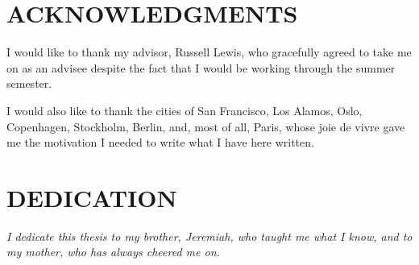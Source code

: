 \documentclass[12pt]{report} %
\renewcommand{\listtablename}{LIST OF TABLES}
\begin{document}
\chapter*{ACKNOWLEDGMENTS}
\thispagestyle{fancy} %

I would like to thank my advisor, Russell Lewis, who gracefully agreed to take me on as an advisee despite the fact that I would be working through the summer semester.

I would also like to thank the cities of San Francisco, Los Alamos, Oslo, Copenhagen, Stockholm, Berlin, and, most of all, Paris, whose joie de vivre gave me the motivation I needed to write what I have here written.





\chapter*{DEDICATION}
\thispagestyle{fancy} %

\begin{center}
\textit{I dedicate this thesis to my brother, Jeremiah, who taught me what I know, and to my mother, who has always cheered me on.}
\end{center}



\tableofcontents
\thispagestyle{fancy} %






\end{document}
